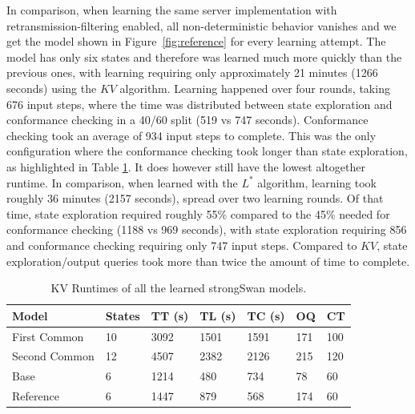 In comparison, when learning the same server implementation with retransmission-filtering enabled, all non-deterministic behavior vanishes and we get the model shown in Figure~\ref{fig:reference} for every learning attempt. The model has only six states and therefore was learned much more quickly than the previous ones, with learning requiring only approximately 21 minutes (1266 seconds) using the $KV$ algorithm. Learning happened over four rounds, taking 676 input steps, where the time was distributed between state exploration and conformance checking in a 40/60 split (519 vs 747 seconds). Conformance checking took an average of 934 input steps to complete. This was the only configuration where the conformance checking took longer than state exploration, as highlighted in Table \ref{tab:runtime_summary_kv}. It does however still have the lowest altogether runtime. In comparison, when learned with the $L^*$ algorithm, learning took roughly 36 minutes (2157 seconds), spread over two learning rounds. Of that time, state exploration required roughly 55\% compared to the 45\% needed for conformance checking (1188 vs 969 seconds), with state exploration requiring 856 and conformance checking requiring only 747 input steps. Compared to $KV$, state exploration/output queries took more than twice the amount of time to complete.\\

\begin{table}[H]
	\centering
	\begin{tabular}{|l|l|l|l|l|l|l|}
		\hline
		\rowcolor[HTML]{C0C0C0} 
		Model     		& States & TT (s)  & TL (s)  & TC (s)  & OQ  & CT  \\ \hline
		First Common 	& 10     & 3092 & 1501 & 1591 & 171 & 100 \\ \hline
		Second Common  	& 12     & 4507 & 2382 & 2126 & 215 & 120 \\ \hline
		Base      		& 6      & 1214 & 480  & 734  & 78  & 60  \\ \hline
		Reference 		& 6      & 1447 & 879  & 568  & 174 & 60  \\ \hline
	\end{tabular}
	\caption{KV Runtimes of all the learned strongSwan models.}
	\label{tab:runtime_summary_kv}
\end{table}

